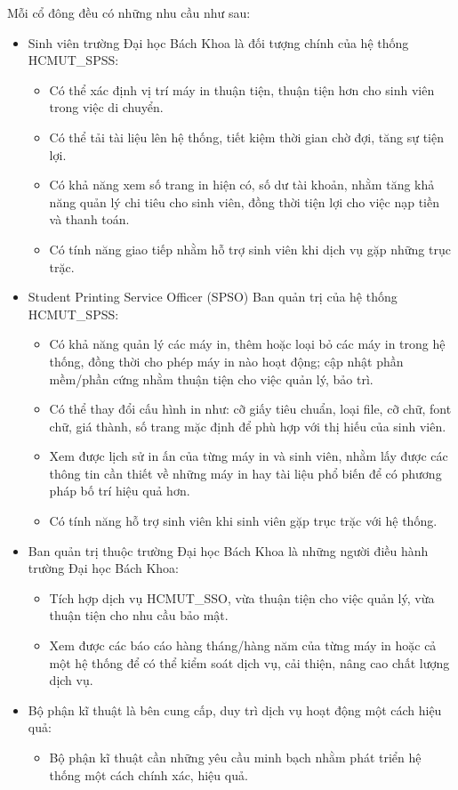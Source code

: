     Mỗi cổ đông đều có những nhu cầu như sau:
    \begin{itemize}
        \item Sinh viên trường Đại học Bách Khoa \text{--} là đối tượng chính của hệ thống HCMUT\_SPSS:
        \begin{itemize}
            \item Có thể xác định vị trí máy in thuận tiện, thuận tiện hơn cho sinh viên trong việc di chuyển.
            \item Có thể tải tài liệu lên hệ thống, tiết kiệm thời gian chờ đợi, tăng sự tiện lợi.
            \item Có khả năng xem số trang in hiện có, số dư tài khoản, nhằm tăng khả năng quản lý chi tiêu cho sinh viên, đồng thời tiện lợi cho việc nạp tiền và thanh toán.
            \item Có tính năng giao tiếp nhằm hỗ trợ sinh viên khi dịch vụ gặp những trục trặc.
        \end{itemize}
        \item Student Printing Service Officer (SPSO) \text{--} Ban quản trị của hệ thống HCMUT\_SPSS:
        \begin{itemize}
            \item Có khả năng quản lý các máy in, thêm hoặc loại bỏ các máy in trong hệ thống, đồng thời cho phép máy in nào hoạt động; cập nhật phần mềm/phần cứng nhằm thuận tiện cho việc quản lý, bảo trì.
            \item Có thể thay đổi cấu hình in như: cỡ giấy tiêu chuẩn, loại file, cỡ chữ, font chữ, giá thành, số trang mặc định để phù hợp với thị hiếu của sinh viên.
            \item Xem được lịch sử in ấn của từng máy in và sinh viên, nhằm lấy được các thông tin cần thiết về những máy in hay tài liệu phổ biến để có phương pháp bố trí hiệu quả hơn.
            \item Có tính năng hỗ trợ sinh viên khi sinh viên gặp trục trặc với hệ thống.
        \end{itemize}
        \item Ban quản trị thuộc trường Đại học Bách Khoa \text{--} là những người điều hành trường Đại học Bách Khoa:
            \begin{itemize}
                \item Tích hợp dịch vụ HCMUT\_SSO, vừa thuận tiện cho việc quản lý, vừa thuận tiện cho nhu cầu bảo mật.
                \item Xem được các báo cáo hàng tháng/hàng năm của từng máy in hoặc cả một hệ thống để có thể kiểm soát dịch vụ, cải thiện, nâng cao chất lượng dịch vụ.
            \end{itemize}
            \item Bộ phận kĩ thuật \text{--} là bên cung cấp, duy trì dịch vụ hoạt động một cách hiệu quả:
            \begin{itemize}
                \item Bộ phận kĩ thuật cần những yêu cầu minh bạch nhằm phát triển hệ thống một cách chính xác, hiệu quả.
            \end{itemize}
    \end{itemize}
